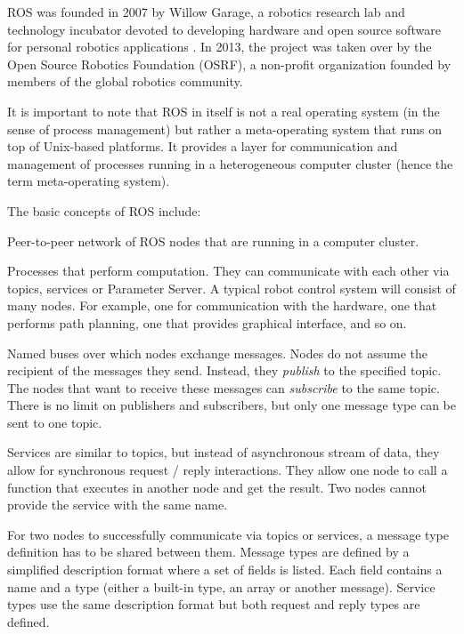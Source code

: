 \documentclass[english,inz,shortabstract]{iithesis}
\begin{document}
    ROS was founded in 2007 by Willow Garage, a robotics research lab and technology incubator devoted to developing hardware and open source software for personal robotics applications \cite{ros:willowgarage}. In 2013, the project was taken over by the Open Source Robotics Foundation (OSRF), a non-profit organization founded by members of the global robotics community.

    It is important to note that ROS in itself is not a real operating system (in the sense of process management) but rather a meta-operating system that runs on top of Unix-based platforms. It provides a layer for communication and management of processes running in a heterogeneous computer cluster (hence the term meta-operating system).

    The basic concepts of ROS include:
    \begin{description}[style=nextline]
        \item [Computation graph] \hfill
        Peer-to-peer network of ROS nodes that are running in a computer cluster.
        \item [Nodes] 
        Processes that perform computation. They can communicate with each other via topics, services or Parameter Server. A typical robot control system will consist of many nodes. For example, one for communication with the hardware, one that performs path planning, one that provides graphical interface, and so on.
        \item [Topics] 
        Named buses over which nodes exchange messages. Nodes do not assume the recipient of the messages they send. Instead, they \textit{publish} to the specified topic. The nodes that want to receive these messages can \textit{subscribe} to the same topic. There is no limit on publishers and subscribers, but only one message type can be sent to one topic.
        \item [Services] 
        Services are similar to topics, but instead of asynchronous stream of data, they allow for synchronous request / reply interactions. They allow one node to call a function that executes in another node and get the result. Two nodes cannot provide the service with the same name.
        \item [Message types]
        For two nodes to successfully communicate via topics or services, a message type definition has to be shared between them. Message types are defined by a simplified description format where a set of fields is listed. Each field contains a name and a type (either a built-in type, an array or another message). Service types use the same description format but both request and reply types are defined.

\end{description}
\end{document}
